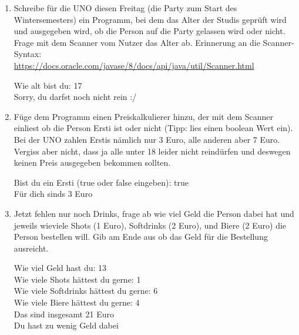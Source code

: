 \documentclass{../../sheet}
\begin{document}
\begin{enumerate}
    \item Schreibe für die UNO diesen Freitag (die Party zum Start des Wintersemesters) ein Programm, bei dem das Alter der Studis geprüft wird und ausgegeben wird, ob die Person auf die Party gelassen wird oder nicht. Frage mit dem Scanner vom Nutzer das Alter ab. Erinnerung an die Scanner-Syntax:\\ \url{https://docs.oracle.com/javase/8/docs/api/java/util/Scanner.html}
    \begin{ausgabe}
        Wie alt bist du: 17\\
        Sorry, du darfst noch nicht rein :/
    \end{ausgabe}
    \item Füge dem Programm einen Preiskalkulierer hinzu, der mit dem Scanner einliest ob die Person Ersti ist oder nicht (Tipp: lies einen boolean Wert ein). Bei der UNO zahlen Erstis nämlich nur 3 Euro, alle anderen aber 7 Euro. Vergiss aber nicht, dass ja alle unter 18 leider nicht reindürfen und deswegen keinen Preis ausgegeben bekommen sollten.
    \begin{ausgabe}
        Bist du ein Ersti (true oder false eingeben): true\\
        Für dich sinds 3 Euro
    \end{ausgabe}
    \item Jetzt fehlen nur noch Drinks, frage ab wie viel Geld die Person dabei hat und jeweils wieviele Shots (1 Euro), Softdrinks (2 Euro), und Biere (2 Euro) die Person bestellen will. Gib am Ende aus ob das Geld für die Bestellung ausreicht.
    \begin{ausgabe}
        Wie viel Geld hast du: 13\\
        Wie viele Shots hättest du gerne: 1\\
        Wie viele Softdrinks hättest du gerne: 6\\
        Wie viele Biere hättest du gerne: 4\\
        Das sind insgesamt 21 Euro\\
        Du hast zu wenig Geld dabei
    \end{ausgabe}
\end{enumerate}
\end{document}
